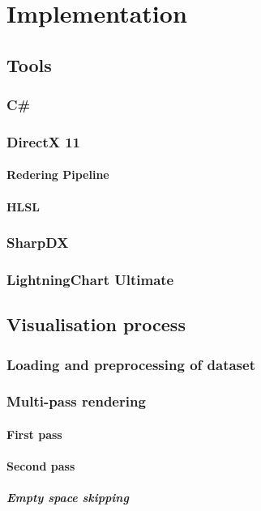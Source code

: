 \documentclass[english]{report}
\begin{document}
\chapter{Implementation}
\section{Tools}
\subsection{C\#}
\subsection{DirectX 11}
\subsubsection{Redering Pipeline}
\subsubsection{HLSL}
\subsection{SharpDX}
\subsection{LightningChart Ultimate}
\section{Visualisation process}
\subsection{Loading and preprocessing of dataset}
\subsection{Multi-pass rendering}
\subsubsection{First pass}
\subsubsection{Second pass}
\paragraph{Empty space skipping}
\end{document}
